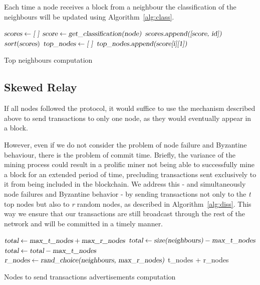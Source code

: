 \documentclass{dads}   %
\begin{document}
Each time a node receives a block from a neighbour the classification of the neighbours will be updated using Algorithm~\ref{alg:class}.

\begin{algorithm}[t]
\begin{algorithmic}[1]
\State $\textsl{scores} \gets \textsl{[ ]}$
  \State $\textsl{score} \gets \textsl{get\_classification(node)}$
  \State $\textsl{scores.append([score, id])}$
\EndFor
\State $sort(\textsl{scores})$
\State $\textsl{top\_nodes} \gets \textsl{[ ]}$
  \State $\textsl{top\_nodes.append(score[i][1])}$
\EndFor
\EndFunction
\end{algorithmic}
\caption{Top neighbours computation}
\label{alg:class}
\end{algorithm}
\subsection{Skewed Relay}
\label{sec:sr}

If all nodes followed the protocol, it would suffice to use the mechanism described above to send 
transactions to only one node, as they would eventually appear in a block.

However, even if we do not consider the problem of node failure and Byzantine behaviour, there is the problem of commit time. 
Briefly, the variance of the mining process could result in a prolific miner not being able to successfully mine a block for an extended period of time, precluding transactions sent exclusively to it from being included in the blockchain.
We address this - and simultaneously node failures and Byzantine behavior - by sending transactions not only to the \textit{t} top nodes but also to \textit{r} random nodes, as described in Algorithm~\ref{alg:diss}. This way we ensure that our transactions are still broadcast through the rest of the network and will be committed in a timely manner.

\begin{algorithm}[t]
\begin{algorithmic}[1]
\EndIf
\State $\textsl{total} \gets \textsl{max\_t\_nodes} + \textsl{max\_r\_nodes}$
	\State $\textsl{total} \gets \textsl{size(neighbours)} - \textsl{max\_t\_nodes}$
\Else
	\State $\textsl{total} \gets \textsl{total} - \textsl{max\_t\_nodes}$
    \EndIf
{}
	\State $\textsl{r\_nodes} \gets \textsl{rand\_choice(neighbours, max\_r\_nodes)}$
    \EndIf
\State \Return t\_nodes + r\_nodes
\EndFunction
\end{algorithmic}
\caption{Nodes to send transactions advertisements computation}
\label{alg:diss}
\end{algorithm}
\end{document}
